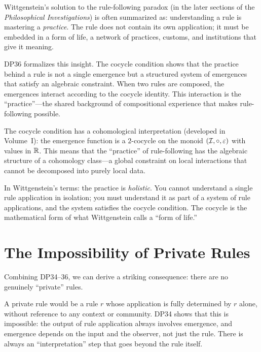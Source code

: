 \begin{interpretation}
\label{interp:practice-behind-rule}
Wittgenstein's solution to the rule-following paradox (in the later
sections of the \textit{Philosophical Investigations}) is often
summarized as: understanding a rule is mastering a \emph{practice}.
The rule does not contain its own application; it must be embedded
in a form of life, a network of practices, customs, and
institutions that give it meaning.

DP36 formalizes this insight.  The cocycle condition shows that the
practice behind a rule is not a single emergence but a structured
system of emergences that satisfy an algebraic constraint.  When
two rules are composed, the emergences interact according to the
cocycle identity.  This interaction is the ``practice''---the
shared background of compositional experience that makes rule-following
possible.

The cocycle condition has a cohomological interpretation (developed
in Volume~I): the emergence function is a $2$-cocycle on the
monoid $(\mathcal{I}, \circ, \varepsilon)$ with values in $\mathbb{R}$.  This means
that the ``practice'' of rule-following has the algebraic structure
of a cohomology class---a global constraint on local interactions
that cannot be decomposed into purely local data.

In Wittgenstein's terms: the practice is \emph{holistic}.  You cannot
understand a single rule application in isolation; you must understand
it as part of a system of rule applications, and the system satisfies
the cocycle condition.  The cocycle is the mathematical form of what
Wittgenstein calls a ``form of life.''
\end{interpretation}

\section{The Impossibility of Private Rules}

Combining DP34--36, we can derive a striking consequence: there are
no genuinely ``private'' rules.

A private rule would be a rule $r$ whose application is fully
determined by $r$ alone, without reference to any context or
community.  DP34 shows that this is impossible: the output of rule
application always involves emergence, and emergence depends on the
input and the observer, not just the rule.  There is always an
``interpretation'' step that goes beyond the rule itself.

